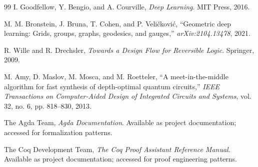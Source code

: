 \begin{thebibliography}{99}
 I. Goodfellow, Y. Bengio, and A. Courville, \emph{Deep Learning}. MIT Press, 2016.

 M. M. Bronstein, J. Bruna, T. Cohen, and P. Veli\v{c}kovi\'c, ``Geometric deep learning: Grids, groups, graphs, geodesics, and gauges,'' \emph{arXiv:2104.13478}, 2021.

 R. Wille and R. Drechsler, \emph{Towards a Design Flow for Reversible Logic}. Springer, 2009.

 M. Amy, D. Maslov, M. Mosca, and M. Roetteler, ``A meet-in-the-middle algorithm for fast synthesis of depth-optimal quantum circuits,'' \emph{IEEE Transactions on Computer-Aided Design of Integrated Circuits and Systems}, vol. 32, no. 6, pp. 818--830, 2013.

 The Agda Team, \emph{Agda Documentation}. Available as project documentation; accessed for formalization patterns.

 The Coq Development Team, \emph{The Coq Proof Assistant Reference Manual}. Available as project documentation; accessed for proof engineering patterns.

\end{thebibliography}
